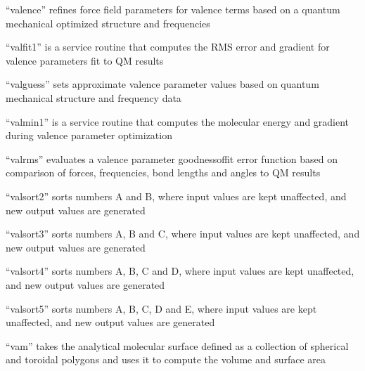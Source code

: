\documentclass[letterpaper,11pt,english]{sphinxmanual}
\begin{document}
\sphinxAtStartPar
“valence” refines force field parameters for valence terms based on a quantum mechanical optimized structure and frequencies

\sphinxAtStartPar
{}

\sphinxAtStartPar
“valfit1” is a service routine that computes the RMS error and gradient for valence parameters fit to QM results

\sphinxAtStartPar
{}

\sphinxAtStartPar
“valguess” sets approximate valence parameter values based on quantum mechanical structure and frequency data

\sphinxAtStartPar
{}

\sphinxAtStartPar
“valmin1” is a service routine that computes the molecular energy and gradient during valence parameter optimization

\sphinxAtStartPar
{}

\sphinxAtStartPar
“valrms” evaluates a valence parameter goodness\sphinxhyphen{}of\sphinxhyphen{}fit error function based on comparison of forces, frequencies, bond lengths and angles to QM results

\sphinxAtStartPar
{}

\sphinxAtStartPar
“valsort2” sorts numbers A and B, where input values are kept unaffected, and new output values are generated

\sphinxAtStartPar
{}

\sphinxAtStartPar
“valsort3” sorts numbers A, B and C, where input values are kept unaffected, and new output values are generated

\sphinxAtStartPar
{}

\sphinxAtStartPar
“valsort4” sorts numbers A, B, C and D, where input values are kept unaffected, and new output values are generated

\sphinxAtStartPar
{}

\sphinxAtStartPar
“valsort5” sorts numbers A, B, C, D and E, where input values are kept unaffected, and new output values are generated

\sphinxAtStartPar
{}

\sphinxAtStartPar
“vam” takes the analytical molecular surface defined as a collection of spherical and toroidal polygons and uses it to compute the volume and surface area
\end{document}
